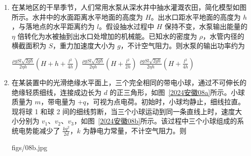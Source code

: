 \documentclass[\gkver]{gaokaozhenti}
\begin{document}
\begin{enumerate}
{故选 A。
}

\item
在某地区的干旱季节，人们常用水泵从深水井中抽水灌溉农田，简化模型如图所示。水井中的水面距离水平地面的高度为 $H$。出水口距水平地面的高度为 $h$，与落地点的水平距离约为 $l$。假设抽水过程中 $H$ 保持不变，水泵输出能量的 $\eta$ 倍转化为水被抽到出水口处增加的机械能。已知水的密度为 $\rho$，水管内径的横截面积为 $S$，重力加速度大小为 $g$，不计空气阻力。则水泵的输出功率约为


{$\frac{\rho gSl\sqrt{2gh}}{2\eta h}\left( H + h + \frac{l^{2}}{4h} \right)$}
{$\frac{\rho gSl\sqrt{2gh}}{2\eta h}\left( H + \frac{l^{2}}{2h} \right)$}
{$\frac{\rho gSl\sqrt{2gh}}{2\eta h}\left( H + \frac{l^{2}}{4h} \right)$}


\item
在某装置中的光滑绝缘水平面上，三个完全相同的带电小球，通过不可伸长的绝缘轻质细线，连接成边长为 $d$ 的正三角形，如图~\ref{2024安徽08a}所示。小球质量为 $m$，带电量为 $+q$，可视为点电荷。初始时，小球均静止，细线拉直。现将球 1 和球 2 间的细线剪断，当三个小球运动到同一条直线上时，速度大小分别为 $v_{1}$、$v_{2}$、$v_{3}$，如图~\ref{2024安徽08b}所示。该过程中三个小球组成的系统电势能减少了 $\frac{kq^{2}}{2d}$，$k$ 为静电力常量，不计空气阻力。则

{figs/08b.jpg}


\end{enumerate}
\end{document}
